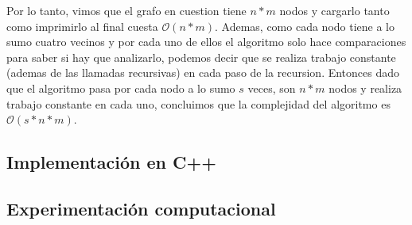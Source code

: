 Por lo tanto, vimos que el grafo en cuestion tiene $n*m$ nodos y cargarlo tanto como imprimirlo al final cuesta $\mathcal{O}(n*m)$. Ademas, como cada nodo tiene a lo sumo cuatro vecinos y por cada uno de ellos el algoritmo solo hace comparaciones para saber si hay que analizarlo, podemos decir que se realiza trabajo constante (ademas de las llamadas recursivas) en cada paso de la recursion. Entonces dado que el algoritmo pasa por cada nodo a lo sumo $s$ veces, son $n*m$ nodos y realiza trabajo constante en cada uno, concluimos que la complejidad del algoritmo es $\mathcal{O}(s*n*m)$.

\newpage
\subsection{Implementación en C++}


\newpage
\subsection{Experimentación computacional}

\pgfplotsset{compat=1.5}

